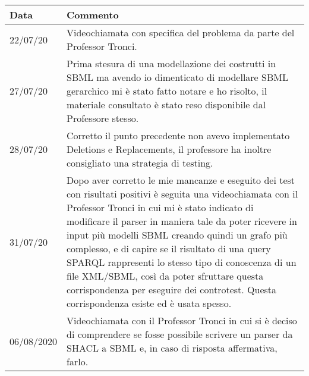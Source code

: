 \documentclass{article}
\begin{document}
\begin{table}[h!t]
    \caption{Cronologia}
    \centering
    \begin{longtable}{p{2cm}p{9cm}}
        \textbf{Data} & \textbf{Commento} \\
        \hline
        22/07/20 & Videochiamata con specifica del problema da parte del Professor Tronci. \\
        \hline
        27/07/20 & Prima stesura di una modellazione dei costrutti in SBML ma avendo io dimenticato di modellare SBML gerarchico mi è stato fatto notare e ho risolto, il materiale consultato è stato reso disponibile dal Professore stesso. \\
        \hline
        28/07/20 & Corretto il punto precedente non avevo implementato Deletions e Replacements, il professore ha inoltre consigliato una strategia di testing. \\
        \hline
        31/07/20 & Dopo aver corretto le mie mancanze e eseguito dei test con risultati positivi è seguita una videochiamata con il Professor Tronci in cui mi è stato indicato di modificare il parser in maniera tale da poter ricevere in input più modelli SBML creando quindi un grafo più complesso, e di capire se il risultato di una query SPARQL rappresenti lo stesso tipo di conoscenza di un file XML/SBML, così da poter sfruttare questa corrispondenza per eseguire dei controtest. Questa corrispondenza esiste ed è usata spesso. \\
        \hline
        06/08/2020 & Videochiamata con il Professor Tronci in cui si è deciso di comprendere se fosse possibile scrivere un parser da SHACL a SBML e, in caso di risposta affermativa, farlo. \\
        \hline
    \end{longtable}
\end{table}

\cleardoublepage
\end{document}
